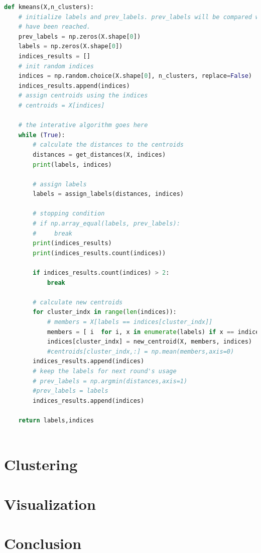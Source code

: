 \documentclass{article}
\begin{document}
\begin{lstlisting}[language=Python, caption= K-Means Algorithm, label={lst:K-Means implementation}]
def kmeans(X,n_clusters):
    # initialize labels and prev_labels. prev_labels will be compared with labels to check if the stopping condition
    # have been reached.
    prev_labels = np.zeros(X.shape[0])
    labels = np.zeros(X.shape[0])
    indices_results = []
    # init random indices
    indices = np.random.choice(X.shape[0], n_clusters, replace=False)
    indices_results.append(indices)
    # assign centroids using the indices
    # centroids = X[indices]
    
    # the interative algorithm goes here
    while (True):
        # calculate the distances to the centroids
        distances = get_distances(X, indices)
        print(labels, indices)

        # assign labels
        labels = assign_labels(distances, indices)
        
        # stopping condition
        # if np.array_equal(labels, prev_labels):
        #     break
        print(indices_results)
        print(indices_results.count(indices))

        if indices_results.count(indices) > 2:
            break
        
        # calculate new centroids
        for cluster_indx in range(len(indices)):
            # members = X[labels == indices[cluster_indx]]
            members = [ i  for i, x in enumerate(labels) if x == indices[cluster_indx]]
            indices[cluster_indx] = new_centroid(X, members, indices)
            #centroids[cluster_indx,:] = np.mean(members,axis=0)
        indices_results.append(indices)
        # keep the labels for next round's usage
        # prev_labels = np.argmin(distances,axis=1)
        #prev_labels = labels
        indices_results.append(indices)
    
    return labels,indices
    
            \end{lstlisting}

        \section{Clustering}


        \section{Visualization}

    
        \section{Conclusion}



      
    
    
    \nocite{*}
\end{document}
